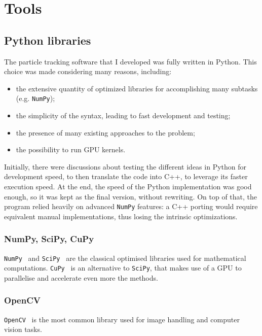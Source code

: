 \chapter{Tools}
\label{chap:tools}

\section{Python libraries}

The particle tracking software that I developed was fully written in Python.
This choice was made considering many reasons, including:
\begin{itemize}
	\itemsep 0em
	\item the extensive quantity of optimized libraries for accomplishing many subtasks (e.g. \texttt{NumPy});
	\item the simplicity of the syntax, leading to fast development and testing;
	\item the presence of many existing approaches to the problem;
	\item the possibility to run GPU kernels.
\end{itemize}
Initially, there were discussions about testing the different ideas in Python for development speed, to then translate the code into C++, to leverage its faster execution speed.
At the end, the speed of the Python implementation was good enough, so it was kept as the final version, without rewriting.
On top of that, the program relied heavily on advanced \texttt{NumPy} features: a C++ porting would require equivalent manual implementations, thus losing the intrinsic optimizations.

\subsection{NumPy, SciPy, CuPy}

\texttt{NumPy}~\cite{numpy} and \texttt{SciPy}~\cite{scipy} are the classical optimised libraries used for mathematical computations.
\texttt{CuPy}~\cite{cupy} is an alternative to \texttt{SciPy}, that makes use of a GPU to parallelise and accelerate even more the methods.

\subsection{OpenCV}

\texttt{OpenCV}~\cite{opencv} is the most common library used for image handling and computer vision tasks.

